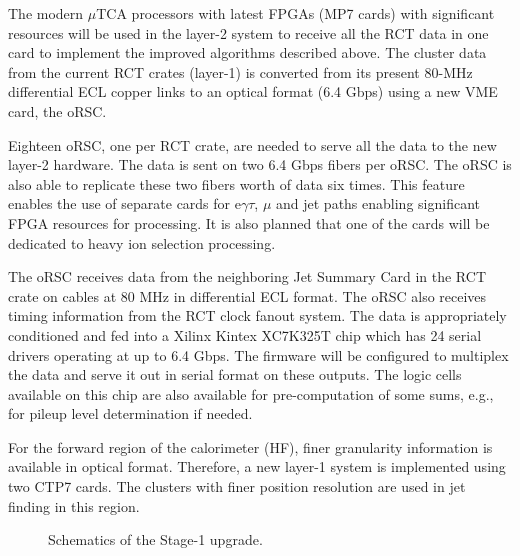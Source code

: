 The modern $\mu$TCA processors with latest FPGAs (MP7 cards) with
significant resources will be used in the layer-2 system to receive
all the RCT data in one card to implement the improved algorithms
described above.  The cluster data from the current RCT crates
(layer-1) is converted from its present 80-MHz differential ECL copper
links to an optical format (6.4 Gbps) using a new VME card, the oRSC.

Eighteen oRSC, one per RCT crate, are needed to serve all the data
to the new layer-2 hardware.  The data is sent on two 6.4 Gbps fibers
per oRSC. The oRSC is also able to replicate these two fibers worth
of data six times.  This feature enables the use of separate 
cards for e$\gamma\tau$, $\mu$ and jet paths enabling significant
FPGA resources for processing.  It is also planned that one of the cards will be dedicated to heavy ion
selection processing. 

The oRSC receives data from the neighboring Jet Summary Card in the
RCT crate on cables at 80 MHz in differential ECL format. The oRSC
also receives timing information from the RCT clock fanout system.
The data is appropriately conditioned and fed into a Xilinx Kintex
XC7K325T chip which has 24 serial drivers operating at up to 6.4 Gbps.
The firmware will be configured to multiplex the data and serve it out
in serial format on these outputs.  The logic cells available on this
chip are also available for pre-computation of some sums, e.g., for
pileup level determination if needed.

For the forward region of the calorimeter (HF), finer granularity 
information is available in optical format.  Therefore, a new layer-1 
system is implemented using two CTP7 cards.  The clusters with finer
position resolution are used in jet finding in this region. 

\begin{figure}
\begin{center}
\vspace{.2in}
\centerline {
}
\vspace{.2in}
\end{center}
\caption{Schematics of the Stage-1 upgrade.
\label{fig:L1_Stage1} }
\end{figure}


